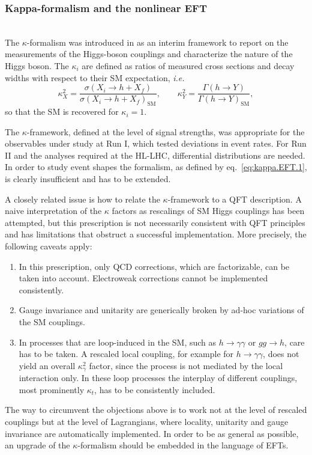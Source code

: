 \subsubsection{Kappa-formalism and the nonlinear EFT}
\label{sec:2:kappavsEFT}
\\
The $\kappa$-formalism was introduced in\cite{LHCHiggsCrossSectionWorkingGroup:2012nn,Heinemeyer:2013tqa} as an interim framework to report on the measurements of the Higgs-boson couplings and characterize the nature of the Higgs boson. The $\kappa_{i}$ are defined as ratios of measured cross sections and decay widths with respect to their SM expectation, {\it i.e.}
\begin{equation}
  \label{eq:kappa.EFT.1}
  \kappa^{2}_{X} = \frac{\sigma(X_i\rightarrow h+X_f)}{\sigma(X_i\rightarrow h+X_f)_{\text{SM}}}, \qquad \kappa^{2}_{Y} = \frac{\Gamma(h\rightarrow Y)}{\Gamma(h\rightarrow Y)_{\text{SM}}},
\end{equation}
so that the SM is recovered for $\kappa_i=1$.

The $\kappa$-framework, defined at the level of signal strengths, was appropriate for the observables under study at Run I, which tested deviations in event rates. For Run II and the analyses required at the HL-LHC, differential distributions are needed. In order to study event shapes the formalism, as defined by eq.~\eqref{eq:kappa.EFT.1}, is clearly insufficient and has to be extended.

A closely related issue is how to relate the $\kappa$-framework to a QFT description. A naive interpretation of the $\kappa$ factors as rescalings of SM Higgs couplings has been attempted, but this prescription is not necessarily consistent with QFT principles and has limitations that obstruct a successful implementation. More precisely, the following caveats apply:
\begin{enumerate}
\item In this prescription, only QCD corrections, which are factorizable, can be taken into account. Electroweak corrections cannot be implemented consistently.
\item Gauge invariance and unitarity are generically broken by ad-hoc variations of the SM couplings.
\item  In processes that are loop-induced in the SM, such as $h\to \gamma\gamma$ or $gg\to h$, care has to be taken. A rescaled local coupling, for example for $h\to \gamma\gamma$, does not yield an overall $\kappa_{\gamma}^2$ factor, since the process is not mediated by the local interaction only. In these loop processes the interplay of different couplings, most prominently $\kappa_t$, has to be consistently included.        
\end{enumerate}
The way to circumvent the objections above is to work not at the level of rescaled couplings but at the level of Lagrangians, where locality, unitarity and gauge invariance are automatically implemented. In order to be as general as possible, an upgrade of the $\kappa$-formalism should be embedded in the language of EFTs.

